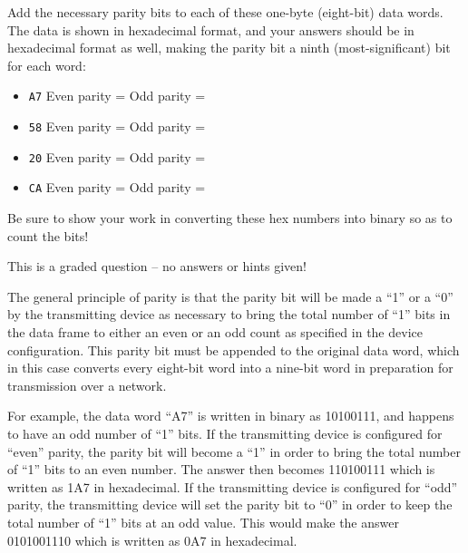 

Add the necessary parity bits to each of these one-byte (eight-bit) data words.  The data is shown in hexadecimal format, and your answers should be in hexadecimal format as well, making the parity bit a ninth (most-significant) bit for each word:

\begin{itemize}
\item{} {\tt A7} \hskip 30pt Even parity = \underbar{\hskip 50pt} \hskip 30pt Odd parity = \underbar{\hskip 50pt}
\vskip 5pt
\item{} {\tt 58} \hskip 30pt Even parity = \underbar{\hskip 50pt} \hskip 30pt Odd parity = \underbar{\hskip 50pt}
\vskip 5pt
\item{} {\tt 20} \hskip 30pt Even parity = \underbar{\hskip 50pt} \hskip 30pt Odd parity = \underbar{\hskip 50pt}
\vskip 5pt
\item{} {\tt CA} \hskip 30pt Even parity = \underbar{\hskip 50pt} \hskip 30pt Odd parity = \underbar{\hskip 50pt}
\end{itemize}

Be sure to show your work in converting these hex numbers into binary so as to count the bits!

\vfil

\eject






This is a graded question -- no answers or hints given!







The general principle of parity is that the parity bit will be made a ``1'' or a ``0'' by the transmitting device as necessary to bring the total number of ``1'' bits in the data frame to either an even or an odd count as specified in the device configuration.  This parity bit must be appended to the original data word, which in this case converts every eight-bit word into a nine-bit word in preparation for transmission over a network.

For example, the data word ``A7'' is written in binary as 10100111, and happens to have an odd number of ``1'' bits.  If the transmitting device is configured for ``even'' parity, the parity bit will become a ``1'' in order to bring the total number of ``1'' bits to an even number.  The answer then becomes 110100111 which is written as 1A7 in hexadecimal.  If the transmitting device is configured for ``odd'' parity, the transmitting device will set the parity bit to ``0'' in order to keep the total number of ``1'' bits at an odd value.  This would make the answer 0101001110 which is written as 0A7 in hexadecimal.

